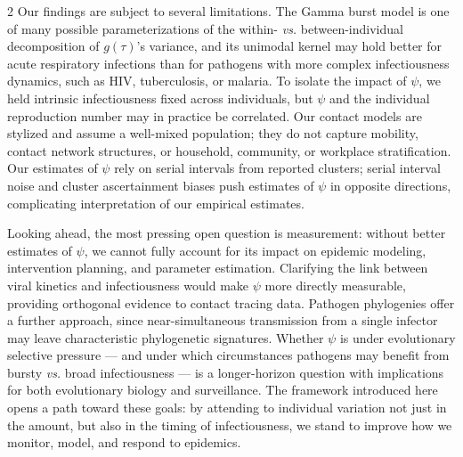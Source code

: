 \documentclass[10pt]{article}
\makeatletter
\newcommand{\vs}{\textit{vs.}\@\xspace}
\makeatother
\begin{document}
\begin{multicols}{2}
Our findings are subject to several limitations. The Gamma burst model is one of many possible parameterizations of the within- \vs between-individual decomposition of $g(\tau)$'s variance, and its unimodal kernel may hold better for acute respiratory infections than for pathogens with more complex infectiousness dynamics, such as HIV, tuberculosis, or malaria. To isolate the impact of $\psi$, we held intrinsic infectiousness fixed across individuals, but $\psi$ and the individual reproduction number may in practice be correlated. Our contact models are stylized and assume a well-mixed population; they do not capture mobility, contact network structures, or household, community, or workplace stratification. Our estimates of $\psi$ rely on serial intervals from reported clusters; serial interval noise and cluster ascertainment biases push estimates of $\psi$ in opposite directions, complicating interpretation of our empirical estimates. 

Looking ahead, the most pressing open question is measurement: without better estimates of $\psi$, we cannot fully account for its impact on epidemic modeling, intervention planning, and parameter estimation. Clarifying the link between viral kinetics and infectiousness would make $\psi$ more directly measurable, providing orthogonal evidence to contact tracing data. Pathogen phylogenies offer a further approach, since near-simultaneous transmission from a single infector may leave characteristic phylogenetic signatures. Whether $\psi$ is under evolutionary selective pressure --- and under which circumstances pathogens may benefit from bursty \vs broad infectiousness --- is a longer-horizon question with implications for both evolutionary biology and surveillance. The framework introduced here opens a path toward these goals: by attending to individual variation not just in the amount, but also in the timing of infectiousness, we stand to improve how we monitor, model, and respond to epidemics. 

\clearpage


\ifdefined\sciencemode
  \end{multicols}
  
\else
  
\fi


\end{document}
